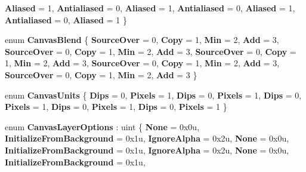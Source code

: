 \begin{DoxyCompactItemize}
{\bfseries Aliased} = 1, 
\newline
{\bfseries Antialiased} = 0, 
{\bfseries Aliased} = 1, 
{\bfseries Antialiased} = 0, 
{\bfseries Aliased} = 1, 
\newline
{\bfseries Antialiased} = 0, 
{\bfseries Aliased} = 1
 \}
\item 
\mbox{\label{namespace_microsoft_1_1_graphics_1_1_canvas_a4d6f8dfcb051c810dfc379d736e689a4}} 
enum {\bfseries Canvas\+Blend} \{ \newline
{\bfseries Source\+Over} = 0, 
{\bfseries Copy} = 1, 
{\bfseries Min} = 2, 
{\bfseries Add} = 3, 
\newline
{\bfseries Source\+Over} = 0, 
{\bfseries Copy} = 1, 
{\bfseries Min} = 2, 
{\bfseries Add} = 3, 
\newline
{\bfseries Source\+Over} = 0, 
{\bfseries Copy} = 1, 
{\bfseries Min} = 2, 
{\bfseries Add} = 3, 
\newline
{\bfseries Source\+Over} = 0, 
{\bfseries Copy} = 1, 
{\bfseries Min} = 2, 
{\bfseries Add} = 3, 
\newline
{\bfseries Source\+Over} = 0, 
{\bfseries Copy} = 1, 
{\bfseries Min} = 2, 
{\bfseries Add} = 3
 \}
\item 
\mbox{\label{namespace_microsoft_1_1_graphics_1_1_canvas_a42a64ab003f060d5bc514b2c0c2f9869}} 
enum {\bfseries Canvas\+Units} \{ \newline
{\bfseries Dips} = 0, 
{\bfseries Pixels} = 1, 
{\bfseries Dips} = 0, 
{\bfseries Pixels} = 1, 
\newline
{\bfseries Dips} = 0, 
{\bfseries Pixels} = 1, 
{\bfseries Dips} = 0, 
{\bfseries Pixels} = 1, 
\newline
{\bfseries Dips} = 0, 
{\bfseries Pixels} = 1
 \}
\item 
\mbox{\label{namespace_microsoft_1_1_graphics_1_1_canvas_a111054cba4b53759d62af260e252fe48}} 
enum {\bfseries Canvas\+Layer\+Options} \+: uint \{ \newline
{\bfseries None} = 0x0u, 
{\bfseries Initialize\+From\+Background} = 0x1u, 
{\bfseries Ignore\+Alpha} = 0x2u, 
{\bfseries None} = 0x0u, 
\newline
{\bfseries Initialize\+From\+Background} = 0x1u, 
{\bfseries Ignore\+Alpha} = 0x2u, 
{\bfseries None} = 0x0u, 
{\bfseries Initialize\+From\+Background} = 0x1u, 

\end{DoxyCompactItemize}

